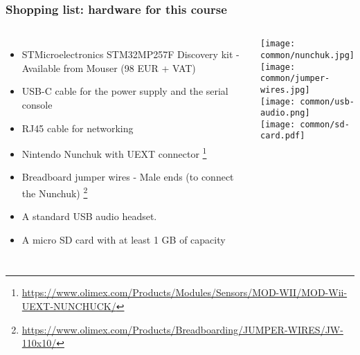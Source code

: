 \begin{frame}
\frametitle{Shopping list: hardware for this course}
  \begin{columns}
    \footnotesize
    \begin{itemize}
      \item STMicroelectronics STM32MP257F Discovery kit -
        Available from Mouser (98 EUR + VAT)
      \item USB-C cable for the power supply and the serial console
      \item RJ45 cable for networking
      \item Nintendo Nunchuk with UEXT connector
            \footnote{\tiny \url{https://www.olimex.com/Products/Modules/Sensors/MOD-WII/MOD-Wii-UEXT-NUNCHUCK/}}
      \item Breadboard jumper wires - Male ends (to connect the Nunchuk)
            \footnote{\tiny \url{https://www.olimex.com/Products/Breadboarding/JUMPER-WIRES/JW-110x10/}}

      \item A standard USB audio headset.
      \item A micro SD card with at least 1 GB of capacity
    \end{itemize}
    \texttt{[image: common/nunchuk.jpg]} \\
    \texttt{[image: common/jumper-wires.jpg]} \\
    \texttt{[image: common/usb-audio.png]} \\
    \texttt{[image: common/sd-card.pdf]}
  \end{columns}
\end{frame}
